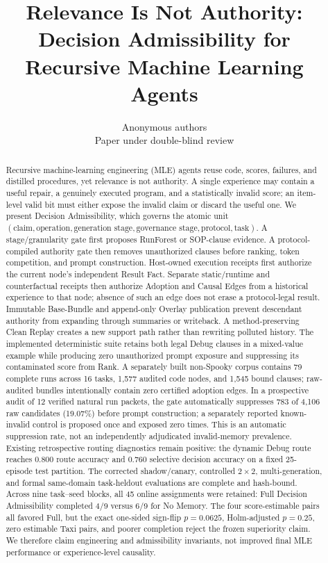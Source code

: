 \documentclass{article}
\title{Relevance Is Not Authority:\\
Decision Admissibility for Recursive Machine Learning Agents}
\author{Anonymous authors\\
Paper under double-blind review}
\newcommand{\ours}{Decision Admissibility}
\begin{document}
\maketitle

\begin{abstract}
Recursive machine-learning engineering (MLE) agents reuse code, scores,
failures, and distilled procedures, yet relevance is not authority.  A single
experience may contain a useful repair, a genuinely executed program, and a
statistically invalid score; an item-level valid bit must either expose the
invalid claim or discard the useful one.  We present \ours{}, which governs the
atomic unit $(\text{claim},\text{operation},\text{generation stage},
\text{governance stage},\text{protocol},\text{task})$.  A stage/granularity gate
first proposes RunForest or SOP-clause evidence.  A protocol-compiled authority
gate then removes unauthorized clauses before ranking, token competition, and
prompt construction.  Host-owned execution receipts first authorize the
current node's independent Result Fact.  Separate static/runtime and
counterfactual receipts then authorize Adoption and Causal Edges from a
historical experience to that node; absence of such an edge does not erase a
protocol-legal result.  Immutable Base-Bundle and append-only Overlay
publication prevent descendant authority from expanding through summaries or
writeback.  A method-preserving Clean
Replay creates a new support path rather than rewriting polluted history.
The implemented deterministic suite retains both legal Debug clauses in a
mixed-value example while producing zero unauthorized prompt exposure and
suppressing its contaminated score from Rank.  A separately built non-Spooky
corpus contains 79 complete runs across 16 tasks, 1,577 audited code nodes, and
1,545 bound clauses; raw-audited bundles intentionally contain zero certified
adoption edges.  In a prospective audit of 12 verified natural run packets,
the gate automatically suppresses 783 of 4,106 raw candidates (19.07\%) before
prompt construction; a separately reported known-invalid control is proposed
once and exposed zero times.  This is an automatic suppression rate, not an
independently adjudicated invalid-memory prevalence.  Existing retrospective
routing diagnostics remain positive:
the dynamic Debug route reaches 0.800 route accuracy and 0.760 selective
decision accuracy on a fixed 25-episode test partition.  The corrected shadow/canary, controlled $2\times2$, multi-generation,
and formal same-domain task-heldout evaluations are complete and hash-bound.
Across nine task--seed blocks, all 45 online assignments were retained: Full
Decision Admissibility completed 4/9 versus 6/9 for No Memory.  The four
score-estimable pairs all favored Full, but the exact one-sided sign-flip
$p=0.0625$, Holm-adjusted $p=0.25$, zero estimable Taxi pairs, and poorer
completion reject the frozen superiority claim.  We therefore claim engineering
and admissibility invariants, not improved final MLE performance or
experience-level causality.
\end{abstract}
\end{document}
